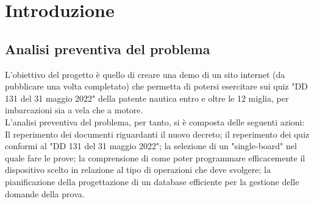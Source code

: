 \chapter{Introduzione}\label{cap:introduzione}

\section{Analisi preventiva del problema}\label{sez: Analisi preventiva}

L'obiettivo del progetto è quello di creare una demo di un sito internet (da pubblicare una volta completato) che permetta di potersi esercitare sui quiz "DD 131 del 31 maggio 2022" della patente nautica entro e oltre le 12 miglia, per imbarcazioni sia a vela che a motore.\\
L'analisi preventiva del problema, per tanto, si è composta delle seguenti azioni: Il reperimento dei documenti riguardanti il nuovo decreto; il reperimento dei quiz conformi al "DD 131 del 31 maggio 2022"; la selezione di un "single-board" nel quale fare le prove; la comprensione di come poter programmare efficacemente il dispositivo scelto in relazione al tipo di operazioni che deve svolgere; la pianificazione della progettazione di un database efficiente per la gestione delle domande della prova.\\

